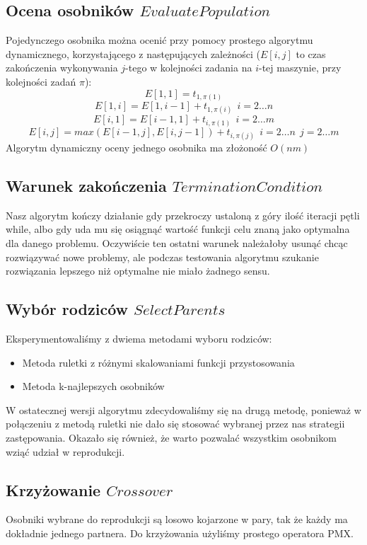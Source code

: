 \documentclass[11pt, a4wide]{article}
\begin{document}
\subsection{Ocena osobników $EvaluatePopulation$}
Pojedynczego osobnika można ocenić przy pomocy prostego algorytmu dynamicznego, korzystającego
z następujących zależności ($E[i,j]$ to czas zakończenia wykonywania $j$-tego w kolejności zadania
na $i$-tej maszynie, przy kolejności zadań $\pi$):
$$ E[1, 1] = t_{1,\pi(1)} $$
$$ E[1, i] = E[1, i-1] + t_{1,\pi(i)}\ \  i = 2 \ldots n$$
$$ E[i, 1] = E[i-1, 1] + t_{i,\pi(1)}\ \  i = 2 \ldots m$$
$$ E[i, j] = max(E[i-1, j], E[i, j-1]) + t_{i, \pi(j)} \ \ i = 2 \ldots n \ \ j = 2 \ldots m $$
Algorytm dynamiczny oceny jednego osobnika ma złożoność $O(nm)$

\subsection{Warunek zakończenia $TerminationCondition$}
Nasz algorytm kończy działanie gdy przekroczy ustaloną z góry ilość iteracji pętli while, albo
gdy uda mu się osiągnąć wartość funkcji celu znaną jako optymalna dla danego problemu. Oczywiście
ten ostatni warunek należałoby usunąć chcąc rozwiązywać nowe problemy, ale podczas testowania 
algorytmu szukanie rozwiązania lepszego niż optymalne nie miało żadnego sensu.

\subsection{Wybór rodziców $SelectParents$}
Eksperymentowaliśmy z dwiema metodami wyboru rodziców:
\begin{itemize}
  \item Metoda ruletki z różnymi skalowaniami funkcji przystosowania
  \item Metoda k-najlepszych osobników
\end{itemize}
W ostatecznej wersji algorytmu zdecydowaliśmy się na drugą metodę, ponieważ
w połączeniu z metodą ruletki nie dało się stosować wybranej przez nas strategii zastępowania. Okazało 
się również, że warto pozwalać wszystkim osobnikom wziąć udział w reprodukcji.

\subsection{Krzyżowanie $Crossover$}
Osobniki wybrane do reprodukcji są losowo kojarzone w pary, tak że każdy ma dokładnie jednego partnera.
Do krzyżowania użyliśmy prostego operatora PMX.
\end{document}
